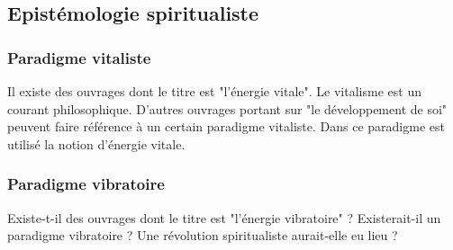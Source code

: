 \subsection{Epistémologie spiritualiste}
\subsubsection{Paradigme vitaliste}

Il existe des ouvrages dont le titre est "l'énergie vitale". Le vitalisme est un courant philosophique. D'autres ouvrages portant sur "le développement de soi" peuvent faire référence à un certain paradigme vitaliste. Dans ce paradigme est utilisé la notion d'énergie vitale.

\subsubsection{Paradigme vibratoire}

Existe-t-il des ouvrages dont le titre est "l'énergie vibratoire" ? Existerait-il un paradigme vibratoire ? Une révolution spiritualiste aurait-elle eu lieu ?

